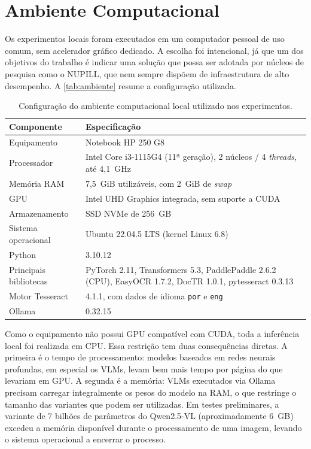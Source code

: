 \documentclass[noabntexcite,oneside]{ufsc-thesis-rn46-2019}
\begin{document}
\section{Ambiente Computacional}
\label{sec:ambiente}

Os experimentos locais foram executados em um computador pessoal de uso comum, sem
acelerador gráfico dedicado. A escolha foi intencional, já que um dos objetivos do trabalho
é indicar uma solução que possa ser adotada por núcleos de pesquisa como o NUPILL, que nem
sempre dispõem de infraestrutura de alto desempenho. A \autoref{tab:ambiente} resume a
configuração utilizada.

\begin{table}[htb]
\centering
\caption{Configuração do ambiente computacional local utilizado nos experimentos.}
\label{tab:ambiente}
\renewcommand{\arraystretch}{1.3}
\begin{tabular}{L{4cm} L{9.5cm}}
\hline
\textbf{Componente} & \textbf{Especificação} \\
\hline
Equipamento          & Notebook HP 250 G8 \\
Processador          & Intel Core i3-1115G4 (11ª geração), 2 núcleos / 4 \textit{threads},
                       até 4,1~GHz \\
Memória RAM          & 7,5~GiB utilizáveis, com 2~GiB de \textit{swap} \\
GPU                  & Intel UHD Graphics integrada, sem suporte a CUDA \\
Armazenamento        & SSD NVMe de 256~GB \\
Sistema operacional  & Ubuntu 22.04.5 LTS (kernel Linux 6.8) \\
Python               & 3.10.12 \\
Principais bibliotecas & PyTorch 2.11, Transformers 5.3, PaddlePaddle 2.6.2 (CPU),
                         EasyOCR 1.7.2, DocTR 1.0.1, pytesseract 0.3.13 \\
Motor Tesseract      & 4.1.1, com dados de idioma \texttt{por} e \texttt{eng} \\
Ollama               & 0.32.15 \\
\hline
\end{tabular}
\end{table}

Como o equipamento não possui GPU compatível com CUDA, toda a inferência local foi
realizada em CPU. Essa restrição tem duas consequências diretas. A primeira é o tempo de
processamento: modelos baseados em redes neurais profundas, em especial os VLMs, levam bem
mais tempo por página do que levariam em GPU. A segunda é a memória: VLMs executados via
Ollama precisam carregar integralmente os pesos do modelo na RAM, o que restringe o tamanho
das variantes que podem ser utilizadas. Em testes preliminares, a variante de 7 bilhões de
parâmetros do Qwen2.5-VL (aproximadamente 6~GB) excedeu a memória disponível durante o
processamento de uma imagem, levando o sistema operacional a encerrar o processo.
\end{document}
